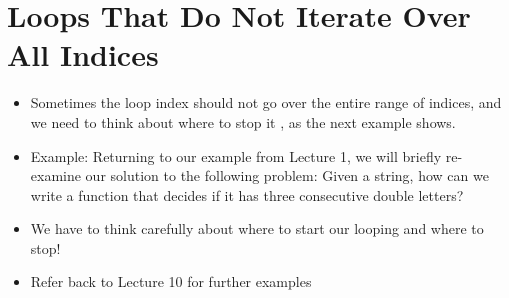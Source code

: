 \documentclass[letterpaper,10pt,english]{sphinxmanual}
\begin{document}
\section{Loops That Do Not Iterate Over All Indices}
\label{\detokenize{lecture_notes/lec12_loops2_for_double:loops-that-do-not-iterate-over-all-indices}}\begin{itemize}
\item {} 
Sometimes the loop index should not go over the entire range of
indices, and we need to think about where to stop it , as the
next example shows.

\item {} 
Example: Returning to our example from Lecture 1, we will briefly
re-examine our solution to the following problem: Given a string,
how can we write a function that decides if it has three
consecutive double letters?

%
\begin{sphinxVerbatim}[commandchars=\\\{\}]
 
        
         \PYG{p}{[}\PYG{p}{]}  \PYG{p}{[}\PYG{p}{]}  \PYG{p}{[}\PYG{p}{]}  \PYG{p}{[}\PYG{p}{]}  \PYG{p}{[}\PYG{p}{]}  \PYG{p}{[}\PYG{p}{]}
             
     
\end{sphinxVerbatim}

\item {} 
We have to think carefully about where to start our looping and
where to stop!

\item {} 
Refer back to Lecture 10 for further examples

\end{itemize}
\end{document}
